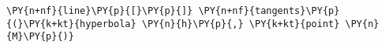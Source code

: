 \begin{Verbatim}[commandchars=\\\{\}]
    \PY{n+nf}{line}\PY{p}{[}\PY{p}{]} \PY{n+nf}{tangents}\PY{p}{(}\PY{k+kt}{hyperbola} \PY{n}{h}\PY{p}{,} \PY{k+kt}{point} \PY{n}{M}\PY{p}{)}
\end{Verbatim}
